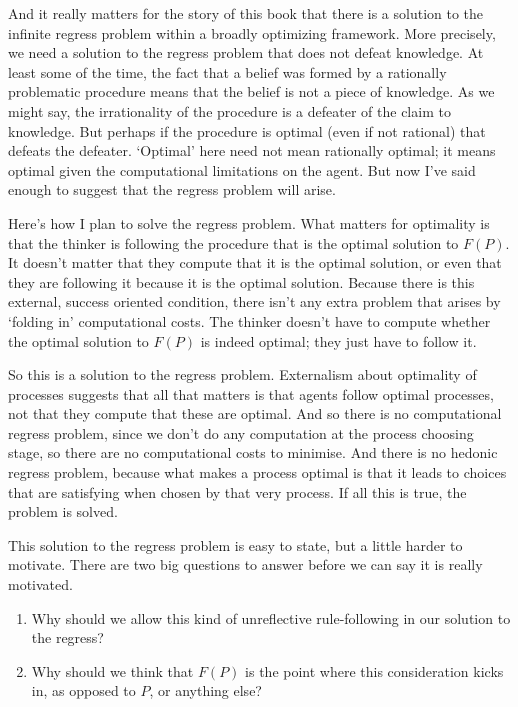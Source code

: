 \documentclass[
  12pt,
]{article}
\providecommand{\tightlist}{%
  \setlength{\itemsep}{0pt}\setlength{\parskip}{0pt}}
\begin{document}
And it really matters for the story of this book that there is a solution to the infinite regress problem within a broadly optimizing framework. More precisely, we need a solution to the regress problem that does not defeat knowledge. At least some of the time, the fact that a belief was formed by a rationally problematic procedure means that the belief is not a piece of knowledge. As we might say, the irrationality of the procedure is a defeater of the claim to knowledge. But perhaps if the procedure is optimal (even if not rational) that defeats the defeater. `Optimal' here need not mean rationally optimal; it means optimal given the computational limitations on the agent. But now I've said enough to suggest that the regress problem will arise.

Here's how I plan to solve the regress problem. What matters for optimality is that the thinker is following the procedure that is the optimal solution to \(F(P)\). It doesn't matter that they compute that it is the optimal solution, or even that they are following it because it is the optimal solution. Because there is this external, success oriented condition, there isn't any extra problem that arises by `folding in' computational costs. The thinker doesn't have to compute whether the optimal solution to \(F(P)\) is indeed optimal; they just have to follow it.

So this is a solution to the regress problem. Externalism about optimality of processes suggests that all that matters is that agents follow optimal processes, not that they compute that these are optimal. And so there is no computational regress problem, since we don't do any computation at the process choosing stage, so there are no computational costs to minimise. And there is no hedonic regress problem, because what makes a process optimal is that it leads to choices that are satisfying when chosen by that very process. If all this is true, the problem is solved.

This solution to the regress problem is easy to state, but a little harder to motivate. There are two big questions to answer before we can say it is really motivated.

\begin{enumerate}
\def\labelenumi{\arabic{enumi}.}
\tightlist
\item
  Why should we allow this kind of unreflective rule-following in our solution to the regress?
\item
  Why should we think that \(F(P)\) is the point where this consideration kicks in, as opposed to \(P\), or anything else?
\end{enumerate}
\end{document}
